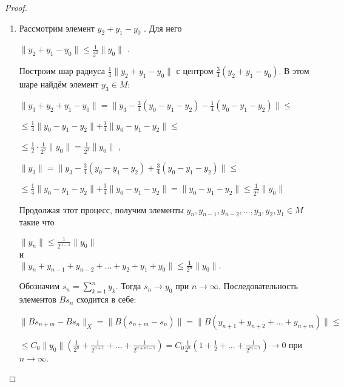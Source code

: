 \documentclass[12pt,a4paper,titlepage]{book}
\theoremstyle{definition}
\theoremstyle{plain}
\theoremstyle{remark}
\theoremstyle{remark}
\theoremstyle{remark}
\theoremstyle{plain}
\begin{document}
\begin{proof}
\begin{enumerate}
	\item Рассмотрим элемент $y_2+y_1- y_0$ . Для него 	\begin{center}	
	$\parallel y_2+y_1- y_0 \parallel \leq
	\frac{1}{2^2} \parallel y_0 \parallel$ .
	\end{center}
	Построим шар радиуса
	$\frac{1}{4} \parallel y_2 + y_1 - y_0 \parallel$      	с центром $\frac{3}{4}(y_2 + y_1 - y_0)$.
	В этом шаре найдём элемент 	$y_3 \in M$:
	\begin{center}
	$\parallel y_3 + y_2 + y_1 - y_0 \parallel =
	\parallel y_3 - \frac{3}{4}(y_0 - y_1 - y_2) -
	\frac{1}{4}(y_0 - y_1 - y_2) \parallel \leq $
	\end{center}
	\begin{center}
	$\leq \frac{1}{4} \parallel y_0 - y_1 - y_2 \parallel +
	\frac{1}{4} \parallel y_0 - y_1 - y_2 \parallel 			\leq $
	\end{center}
	\begin{center}
	$ \leq\frac{1}{2} \cdot
	\frac{1}{2^2} \parallel y_0 \parallel =
	\frac{1}{2^3} \parallel y_0 \parallel$ ,
	\end{center}
	\begin{center}
	$\parallel y_3 \parallel =
	\parallel y_3 - \frac{3}{4}(y_0 - y_1 - y_2) +
	\frac{3}{4}(y_0 - y_1 - y_2) \parallel \leq $
	\end{center}
	\begin{center}
	$\leq \frac{1}{4} \parallel y_0 - y_1 - y_2 				\parallel +
	\frac{3}{4} \parallel y_0 - y_1 - y_2 \parallel =
	 \parallel y_0 - y_1 - y_2 \parallel \leq
	 \frac{1}{2^2} \parallel y_0 \parallel$
	\end{center}

Продолжая этот процесс, получим элементы $y_n, y_{n-1}, y_{n-2}, ..., y_3, y_2, y_1 \in M$ такие что 
\begin{center}
$\lVert y_n \rVert \leq \frac{1}{2^{n-1}} \lVert y_0 \rVert$\\
и\\
$\lVert y_n + y_{n-1}+y_{n-2}+...+y_2+y_1+y_0 \rVert \leq \frac{1}{2^n} \lVert y_0 \rVert.$
\end{center}

Обозначим $s_n= \sum\limits_{k=1}^n y_k$. Тогда $s_n \rightarrow y_0$ при $n \rightarrow \infty$. Последовательность элементов $B s_n$ сходится в себе:
\begin{center}
$ \lVert B s_{n+m}-B s_n \rVert _X = \lVert B(s_{n+m}-s_n) \rVert= \lVert B(y_{n+1}+y_{n+2}+...+y_{n+m}) \rVert \leq $
\end{center}
\begin{center}
$\leq C_0 \lVert y_0 \rVert (\frac{1}{2^n} + \frac{1}{2^{n+1}}+...+\frac{1}{2^{n+m-1}})=C_0 \frac{1}{2^n} (1 + \frac{1}{2}+...+\frac{1}{2^{m-1}}) \rightarrow 0$ при $n \rightarrow \infty$.
\end{center}


\end{enumerate}
\end{proof}
\end{document}
